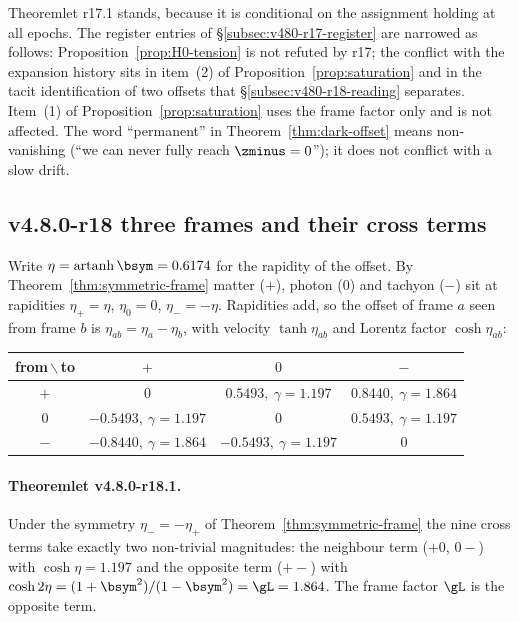 Theoremlet r17.1 stands, because it is conditional on the assignment holding at all epochs.  The register entries of
\S\ref{subsec:v480-r17-register} are narrowed as follows: Proposition~\ref{prop:H0-tension} is not refuted by r17;
the conflict with the expansion history sits in item~(2) of Proposition~\ref{prop:saturation} and in the tacit
identification of two offsets that \S\ref{subsec:v480-r18-reading} separates.  Item~(1) of
Proposition~\ref{prop:saturation} uses the frame factor only and is not affected.  The word ``permanent'' in
Theorem~\ref{thm:dark-offset} means non-vanishing (``we can never fully reach \(\zminus=0\)''); it does not
conflict with a slow drift.

\subsection*{v4.8.0-r18 three frames and their cross terms}
\label{subsec:v480-r18-cross-terms}

Write \(\eta=\operatorname{artanh}\bsym=0.6174\) for the rapidity of the offset.  By
Theorem~\ref{thm:symmetric-frame} matter (\(+\)), photon (\(0\)) and tachyon (\(-\)) sit at rapidities
\(\eta_+=\eta\), \(\eta_0=0\), \(\eta_-=-\eta\).  Rapidities add, so the offset of frame \(a\) seen from frame \(b\) is
\(\eta_{ab}=\eta_a-\eta_b\), with velocity \(\tanh\eta_{ab}\) and Lorentz factor \(\cosh\eta_{ab}\):
\begin{center}
\small
\begin{tabular}{@{}c|ccc@{}}
\toprule
from\,\(\backslash\)\,to & \(+\) & \(0\) & \(-\)\\
\midrule
\(+\) & \(0\) & \(0.5493,\ \gamma=1.197\) & \(0.8440,\ \gamma=1.864\)\\
\(0\) & \(-0.5493,\ \gamma=1.197\) & \(0\) & \(0.5493,\ \gamma=1.197\)\\
\(-\) & \(-0.8440,\ \gamma=1.864\) & \(-0.5493,\ \gamma=1.197\) & \(0\)\\
\bottomrule
\end{tabular}
\end{center}

\paragraph{Theoremlet v4.8.0-r18.1.}
Under the symmetry \(\eta_-=-\eta_+\) of Theorem~\ref{thm:symmetric-frame} the nine cross terms take exactly two
non-trivial magnitudes: the neighbour term (\(+0\), \(0-\)) with \(\cosh\eta=1.197\) and the opposite term (\(+-\))
with \(\cosh2\eta=(1+\bsym^2)/(1-\bsym^2)=\gL=1.864\).  The frame factor \(\gL\) is the opposite term.

